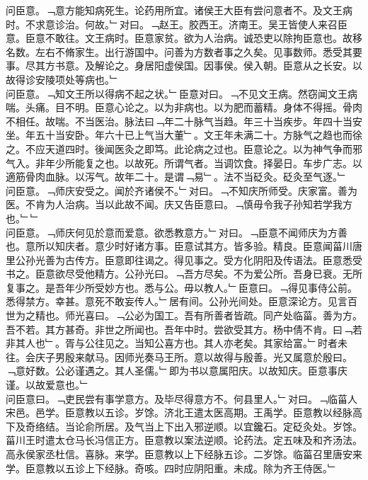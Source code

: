 \documentclass{zhvt-classic}
\begin{document}
\hspace*{2em}问臣意。﹁意方能知病死生。论药用所宜。诸侯王大臣有尝问意者不。及文王病时。不求意诊治。何故。﹂对曰。﹁赵王。胶西王。济南王。吴王皆使人来召臣意。臣意不敢往。文王病时。臣意家贫。欲为人治病。诚恐吏以除拘臣意也。故移名数。左右不脩家生。出行游国中。问善为方数者事之久矣。见事数师。悉受其要事。尽其方书意。及解论之。身居阳虚侯国。因事侯。侯入朝。臣意从之长安。以故得诊安陵项处等病也。﹂\\
\hspace*{2em}问臣意。﹁知文王所以得病不起之状。﹂臣意对曰。﹁不见文王病。然窃闻文王病喘。头痛。目不明。臣意心论之。以为非病也。以为肥而蓄精。身体不得摇。骨肉不相任。故喘。不当医治。脉法曰﹁年二十脉气当趋。年三十当疾步。年四十当安坐。年五十当安卧。年六十已上气当大董﹂。文王年未满二十。方脉气之趋也而徐之。不应天道四时。後闻医灸之即笃。此论病之过也。臣意论之。以为神气争而邪气入。非年少所能复之也。以故死。所谓气者。当调饮食。择晏日。车步广志。以適筋骨肉血脉。以泻气。故年二十。是谓﹁易﹂。法不当砭灸。砭灸至气逐。﹂\\
\hspace*{2em}问臣意。﹁师庆安受之。闻於齐诸侯不。﹂对曰。﹁不知庆所师受。庆家富。善为医。不肯为人治病。当以此故不闻。庆又告臣意曰。﹁慎毋令我子孙知若学我方也。﹂﹂\\
\hspace*{2em}问臣意。﹁师庆何见於意而爱意。欲悉教意方。﹂对曰。﹁臣意不闻师庆为方善也。意所以知庆者。意少时好诸方事。臣意试其方。皆多验。精良。臣意闻菑川唐里公孙光善为古传方。臣意即往谒之。得见事之。受方化阴阳及传语法。臣意悉受书之。臣意欲尽受他精方。公孙光曰。﹁吾方尽矣。不为爱公所。吾身已衰。无所复事之。是吾年少所受妙方也。悉与公。毋以教人。﹂臣意曰。﹁得见事侍公前。悉得禁方。幸甚。意死不敢妄传人。﹂居有间。公孙光间处。臣意深论方。见言百世为之精也。师光喜曰。﹁公必为国工。吾有所善者皆疏。同产处临菑。善为方。吾不若。其方甚奇。非世之所闻也。吾年中时。尝欲受其方。杨中倩不肯。曰﹁若非其人也﹂。胥与公往见之。当知公喜方也。其人亦老矣。其家给富。﹂时者未往。会庆子男殷来献马。因师光奏马王所。意以故得与殷善。光又属意於殷曰。﹁意好数。公必谨遇之。其人圣儒。﹂即为书以意属阳庆。以故知庆。臣意事庆谨。以故爱意也。﹂\\
\hspace*{2em}问臣意曰。﹁吏民尝有事学意方。及毕尽得意方不。何县里人。﹂对曰。﹁临菑人宋邑。邑学。臣意教以五诊。岁馀。济北王遣太医高期。王禹学。臣意教以经脉高下及奇络结。当论俞所居。及气当上下出入邪逆顺。以宜鑱石。定砭灸处。岁馀。菑川王时遣太仓马长冯信正方。臣意教以案法逆顺。论药法。定五味及和齐汤法。高永侯家丞杜信。喜脉。来学。臣意教以上下经脉五诊。二岁馀。临菑召里唐安来学。臣意教以五诊上下经脉。奇咳。四时应阴阳重。未成。除为齐王侍医。﹂\\
\end{document}

